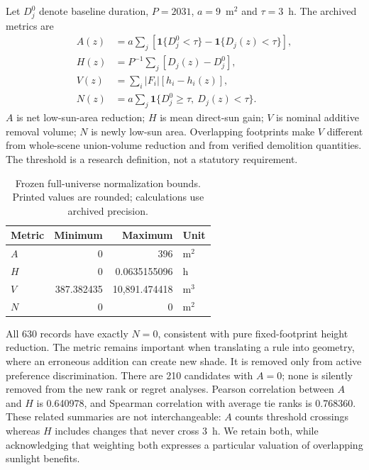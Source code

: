 \documentclass{llncs}
\newcommand{\ind}{\mathbf{1}}
\begin{document}
Let $D_j^0$ denote baseline duration, $P=2031$, $a=9$~m$^2$ and $\tau=3$~h. The archived metrics are
\begin{align}
 A(z)&=a\sum_j[\ind\{D_j^0<\tau\}-\ind\{D_j(z)<\tau\}],\label{eq:A}\\
 H(z)&=P^{-1}\sum_j[D_j(z)-D_j^0],\label{eq:H}\\
 V(z)&=\sum_i|F_i|[h_i-h_i(z)],\label{eq:V}\\
 N(z)&=a\sum_j\ind\{D_j^0\geq\tau,\ D_j(z)<\tau\}.\label{eq:N}
\end{align}
$A$ is net low-sun-area reduction; $H$ is mean direct-sun gain; $V$ is nominal additive removal volume; $N$ is newly low-sun area. Overlapping footprints make $V$ different from whole-scene union-volume reduction and from verified demolition quantities. The threshold is a research definition, not a statutory requirement.

\begin{table}[tbp]\caption{Frozen full-universe normalization bounds. Printed values are rounded; calculations use archived precision.}\label{tab:bounds}\centering
\begin{tabular}{lrrl}\toprule Metric & Minimum & Maximum & Unit\\\midrule
$A$ & 0 & 396 & m$^2$\\ $H$ & 0 & 0.0635155096 & h\\ $V$ & 387.382435 & 10,891.474418 & m$^3$\\ $N$ & 0 & 0 & m$^2$\\\bottomrule\end{tabular}\end{table}

All 630 records have exactly $N=0$, consistent with pure fixed-footprint height reduction. The metric remains important when translating a rule into geometry, where an erroneous addition can create new shade. It is removed only from active preference discrimination. There are 210 candidates with $A=0$; none is silently removed from the new rank or regret analyses. Pearson correlation between $A$ and $H$ is 0.640978, and Spearman correlation with average tie ranks is 0.768360. These related summaries are not interchangeable: $A$ counts threshold crossings whereas $H$ includes changes that never cross 3~h. We retain both, while acknowledging that weighting both expresses a particular valuation of overlapping sunlight benefits.
\end{document}

